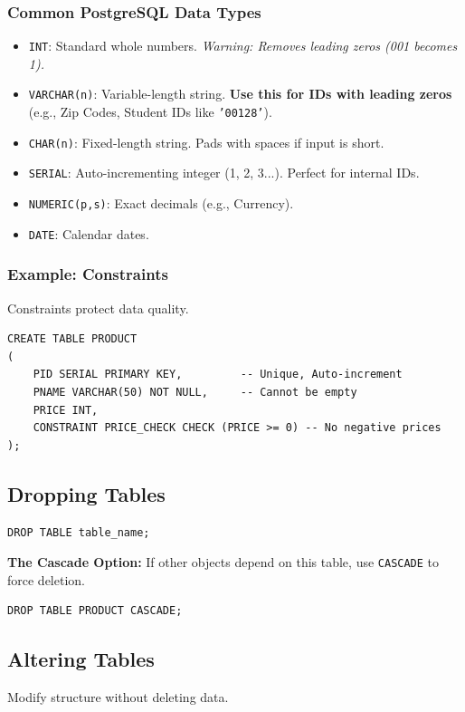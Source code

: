 \documentclass[12pt,a4paper]{article}
\begin{document}
\subsubsection{Common PostgreSQL Data Types}
\begin{itemize}
    \item \texttt{INT}: Standard whole numbers. \textit{Warning: Removes leading zeros (001 becomes 1).}
    \item \texttt{VARCHAR(n)}: Variable-length string. \textbf{Use this for IDs with leading zeros} (e.g., Zip Codes, Student IDs like \texttt{'00128'}).
    \item \texttt{CHAR(n)}: Fixed-length string. Pads with spaces if input is short.
    \item \texttt{SERIAL}: Auto-incrementing integer (1, 2, 3...). Perfect for internal IDs.
    \item \texttt{NUMERIC(p,s)}: Exact decimals (e.g., Currency).
    \item \texttt{DATE}: Calendar dates.
\end{itemize}

\subsubsection{Example: Constraints}
Constraints protect data quality.
\begin{lstlisting}
CREATE TABLE PRODUCT
(
    PID SERIAL PRIMARY KEY,         -- Unique, Auto-increment
    PNAME VARCHAR(50) NOT NULL,     -- Cannot be empty
    PRICE INT,
    CONSTRAINT PRICE_CHECK CHECK (PRICE >= 0) -- No negative prices
);
\end{lstlisting}

\subsection{Dropping Tables}
\begin{lstlisting}
DROP TABLE table_name;
\end{lstlisting}

\textbf{The Cascade Option:}
If other objects depend on this table, use \texttt{CASCADE} to force deletion.
\begin{lstlisting}
DROP TABLE PRODUCT CASCADE;
\end{lstlisting}

\subsection{Altering Tables}
Modify structure without deleting data.
\end{document}

